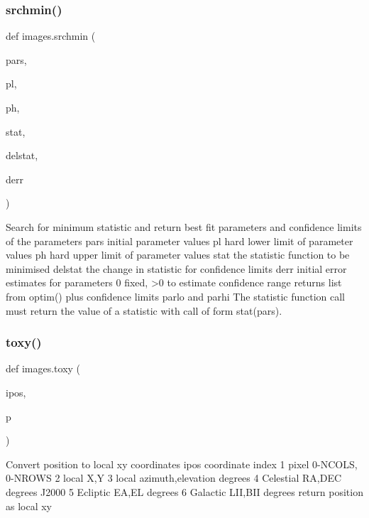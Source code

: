 \subsubsection{\texorpdfstring{srchmin()}{srchmin()}}
{\footnotesize\ttfamily def images.\+srchmin (\begin{DoxyParamCaption}\item[{}]{pars,  }\item[{}]{pl,  }\item[{}]{ph,  }\item[{}]{stat,  }\item[{}]{delstat,  }\item[{}]{derr }\end{DoxyParamCaption})}

\begin{DoxyVerb}Search for minimum statistic and return best fit parameters and confidence limits of the parameters
    pars        initial parameter values
    pl          hard lower limit of parameter values
    ph          hard upper limit of parameter values
    stat        the statistic function to be minimised
    delstat     the change in statistic for confidence limits
    derr        initial error estimates for parameters
                0 fixed, >0 to estimate confidence range
returns     list from optim() plus confidence limits parlo and parhi
    The statistic function call must return the value of a statistic with call of form stat(pars).
\end{DoxyVerb}
 \mbox{\label{namespaceimages_a5a4b780aa3a5620fdc96c7d8c5e7be4e}} 
\subsubsection{\texorpdfstring{toxy()}{toxy()}}
{\footnotesize\ttfamily def images.\+toxy (\begin{DoxyParamCaption}\item[{}]{ipos,  }\item[{}]{p }\end{DoxyParamCaption})}

\begin{DoxyVerb}Convert position to local xy coordinates
    ipos    coordinate index
        1 pixel 0-NCOLS, 0-NROWS
        2 local X,Y
        3 local azimuth,elevation degrees
        4 Celestial RA,DEC degrees J2000
        5 Ecliptic EA,EL degrees
        6 Galactic LII,BII degrees
return  position as local xy
\end{DoxyVerb}
 
